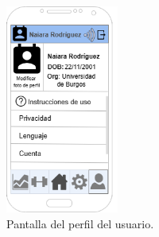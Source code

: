 \begin{figure}[h]
    \centering
    \includegraphics[width=0.33\textwidth]{img/PantallaPerfil.png}
    \caption{Pantalla del perfil del usuario.}
    \label{fig:perfil} %
\end{figure}
